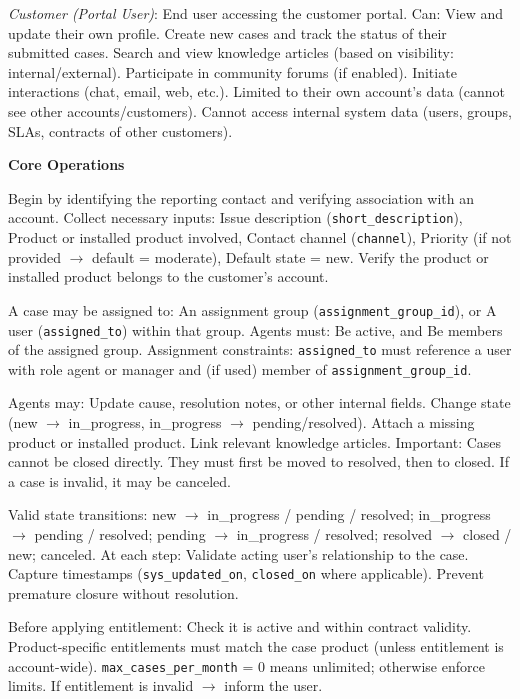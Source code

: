\begin{taskbox}
\textit{Customer (Portal User)}: End user accessing the customer portal. Can: View and update their own profile. Create new cases and track the status of their submitted cases. Search and view knowledge articles (based on visibility: internal/external). Participate in community forums (if enabled). Initiate interactions (chat, email, web, etc.). Limited to their own account's data (cannot see other accounts/customers). Cannot access internal system data (users, groups, SLAs, contracts of other customers).

\textbf{Core Operations}

\begin{description}
    \setlength\itemsep{0.2em}
    \item[Registering a Customer Case:] Begin by identifying the reporting contact and verifying association with an account. Collect necessary inputs: Issue description (\texttt{short\_description}), Product or installed product involved, Contact channel (\texttt{channel}), Priority (if not provided $\to$ default = moderate), Default state = new. Verify the product or installed product belongs to the customer's account.
    \item[Assigning a Case:] A case may be assigned to: An assignment group (\texttt{assignment\_group\_id}), or A user (\texttt{assigned\_to}) within that group. Agents must: Be active, and Be members of the assigned group. Assignment constraints: \texttt{assigned\_to} must reference a user with role agent or manager and (if used) member of \texttt{assignment\_group\_id}.
    \item[Working on a Case:] Agents may: Update cause, resolution notes, or other internal fields. Change state (new $\to$ in\_progress, in\_progress $\to$ pending/resolved). Attach a missing product or installed product. Link relevant knowledge articles. Important: Cases cannot be closed directly. They must first be moved to resolved, then to closed. If a case is invalid, it may be canceled.
    \item[Case Lifecycle Management:] Valid state transitions: new $\to$ in\_progress / pending / resolved; in\_progress $\to$ pending / resolved; pending $\to$ in\_progress / resolved; resolved $\to$ closed / new; canceled. At each step: Validate acting user's relationship to the case. Capture timestamps (\texttt{sys\_updated\_on}, \texttt{closed\_on} where applicable). Prevent premature closure without resolution.
    \item[Entitlement Validation:] Before applying entitlement: Check it is active and within contract validity. Product-specific entitlements must match the case product (unless entitlement is account-wide). \texttt{max\_cases\_per\_month} = 0 means unlimited; otherwise enforce limits. If entitlement is invalid $\to$ inform the user.

\end{description}
\end{taskbox}
